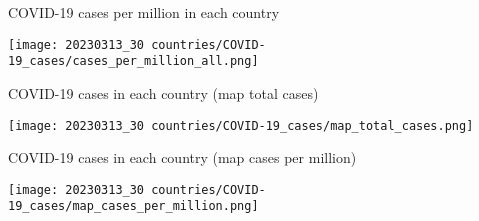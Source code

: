 \documentclass{beamer}
\begin{document}
\begin{frame}{COVID-19 cases per million in each country}
\begin{center}
\texttt{[image: 20230313\_30 countries/COVID-19\_cases/cases\_per\_million\_all.png]}
\end{center}    
\end{frame}


\begin{frame}{COVID-19 cases in each country (map total cases)}
\begin{center}
\texttt{[image: 20230313\_30 countries/COVID-19\_cases/map\_total\_cases.png]}
\end{center}    
\end{frame}

\begin{frame}{COVID-19 cases in each country (map cases per million)}
\begin{center}
\texttt{[image: 20230313\_30 countries/COVID-19\_cases/map\_cases\_per\_million.png]}
\end{center}    
\end{frame}
\end{document}
